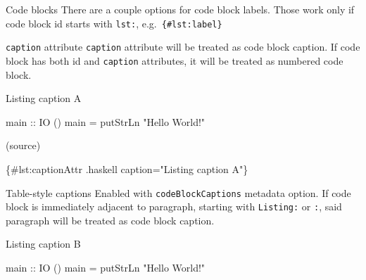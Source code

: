 \documentclass[
  10pt,
  ignorenonframetext,
  serif,onlymath]{beamer}
\newenvironment{Shaded}{}{}
\newcommand{\DataTypeTok}[1]{\textcolor[rgb]{0.56,0.13,0.00}{#1}}
\newcommand{\FunctionTok}[1]{\textcolor[rgb]{0.02,0.16,0.49}{#1}}
\newcommand{\NormalTok}[1]{#1}
\newcommand{\OtherTok}[1]{\textcolor[rgb]{0.00,0.44,0.13}{#1}}
\newcommand{\StringTok}[1]{\textcolor[rgb]{0.25,0.44,0.63}{#1}}
\begin{document}
\begin{frame}[fragile]{Code blocks}
\label{code-blocks}
There are a couple options for code block labels. Those work only if
code block id starts with \texttt{lst:}, e.g.~\texttt{\{\#lst:label\}}
\end{frame}

\begin{frame}[fragile]{\texttt{caption} attribute}
\label{caption-attribute}
\texttt{caption} attribute will be treated as code block caption. If
code block has both id and \texttt{caption} attributes, it will be
treated as numbered code block.

\begin{codelisting}

\caption{Listing caption A}\label{lst:try0}

\begin{Shaded}
\begin{Highlighting}[]
\OtherTok{main ::} \DataTypeTok{IO}\NormalTok{ ()}
\NormalTok{main }\OtherTok{=} \FunctionTok{putStrLn} \StringTok{"Hello World!"}
\end{Highlighting}
\end{Shaded}

\end{codelisting}

(source)

\begin{Shaded}
\begin{Highlighting}[]
\NormalTok{\{\#lst:captionAttr .haskell caption="Listing caption A"\}}
\end{Highlighting}
\end{Shaded}
\end{frame}

\begin{frame}[fragile]{Table-style captions}
\label{table-style-captions}
Enabled with \texttt{codeBlockCaptions} metadata option. If code block
is immediately adjacent to paragraph, starting with \texttt{Listing:} or
\texttt{:}, said paragraph will be treated as code block caption.

\begin{codelisting}

\caption{Listing caption B}\label{lst:try1}

\begin{Shaded}
\begin{Highlighting}[]
\OtherTok{main ::} \DataTypeTok{IO}\NormalTok{ ()}
\NormalTok{main }\OtherTok{=} \FunctionTok{putStrLn} \StringTok{"Hello World!"}
\end{Highlighting}
\end{Shaded}

\end{codelisting}
\end{frame}
\end{document}
